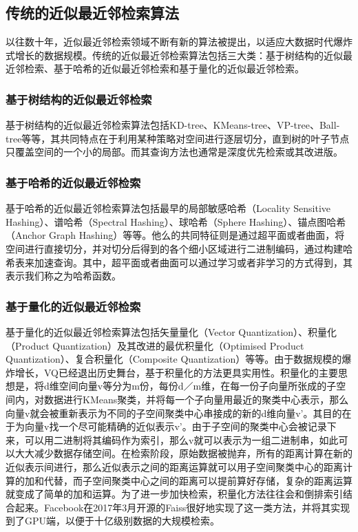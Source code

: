 \subsection{传统的近似最近邻检索算法}
以往数十年，近似最近邻检索领域不断有新的算法被提出，以适应大数据时代爆炸式增长的数据规模。传统的近似最近邻检索算法包括三大类：基于树结构的近似最近邻检索、基于哈希的近似最近邻检索和基于量化的近似最近邻检索。
\subsubsection{基于树结构的近似最近邻检索}
基于树结构的近似最近邻检索算法包括KD-tree、KMeans-tree、VP-tree、Ball-tree等等，其共同特点在于利用某种策略对空间进行逐层切分，直到树的叶子节点只覆盖空间的一个小的局部。而其查询方法也通常是深度优先检索或其改进版。
\subsubsection{基于哈希的近似最近邻检索}
基于哈希的近似最近邻检索算法包括最早的局部敏感哈希（Locality Sensitive Hashing）、谱哈希（Spectral Hashing）、球哈希（Sphere Hashing）、锚点图哈希（Anchor Graph Hashing）等等。他么的共同特征则是通过超平面或者曲面，将空间进行直接切分，并对切分后得到的各个细小区域进行二进制编码，通过构建哈希表来加速查询。其中，超平面或者曲面可以通过学习或者非学习的方式得到，其表示我们称之为哈希函数。
\subsubsection{基于量化的近似最近邻检索}
基于量化的近似最近邻检索算法包括矢量量化（Vector Quantization）、积量化（Product Quantization）及其改进的最优积量化（Optimised Product Quantization）、复合积量化（Composite Quantization）等等。由于数据规模的爆炸增长，VQ已经退出历史舞台，基于积量化的方法更具实用性。积量化的主要思想是，将d维空间向量v等分为m份，每份d／m维，在每一份子向量所张成的子空间内，对数据进行KMeans聚类，并将每一个子向量用最近的聚类中心表示，那么向量v就会被重新表示为不同的子空间聚类中心串接成的新的d维向量v’。其目的在于为向量v找一个尽可能精确的近似表示v’。由于子空间的聚类中心会被记录下来，可以用二进制将其编码作为索引，那么v就可以表示为一组二进制串，如此可以大大减少数据存储空间。在检索阶段，原始数据被抛弃，所有的距离计算在新的近似表示间进行，那么近似表示之间的距离运算就可以用子空间聚类中心的距离计算的加和代替，而子空间聚类中心之间的距离可以提前算好存储，复杂的距离运算就变成了简单的加和运算。为了进一步加快检索，积量化方法往往会和倒排索引结合起来。Facebook在2017年3月开源的Faiss很好地实现了这一类方法，并将其实现到了GPU端，以便于十亿级别数据的大规模检索。
